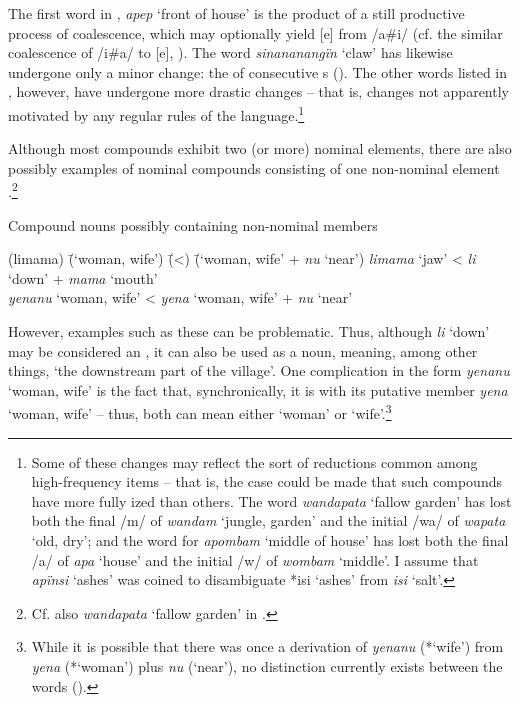 The first word in , \textit{apep} ‘front of house’ is the product of a still productive  process of coalescence, which may optionally yield [e] from /a\#i/ (cf. the similar coalescence of /i\#a/ to [e], ). The word \textit{sinananangïn} ‘claw’ has likewise undergone only a minor change: the  of consecutive s (). The other words listed in , however, have undergone more drastic changes – that is, changes not apparently motivated by any regular  rules of the language.\footnote{Some of these changes may reflect the sort of  reductions common among high-frequency  items -- that is, the case could be made that such compounds have more fully ized than others. The word \textit{wandapata} ‘fallow garden’ has lost both the final /m/ of \textit{wandam} ‘jungle, garden’ and the initial /wa/ of \textit{wapata} ‘old, dry’; and the word for \textit{apombam} ‘middle of house’ has lost both the final /a/ of \textit{apa} ‘house’ and the initial /w/ of \textit{wombam} ‘middle’. I assume that \textit{apïnsi} ‘ashes’ was coined to disambiguate *isi ‘ashes’ from \textit{isi} ‘salt’.}

  Although most compounds exhibit two (or more) nominal elements, there are also possibly examples of nominal compounds consisting of one non-nominal element .\footnote{Cf. also \textit{wandapata} ‘fallow garden’ in .}
  
\ea%
    \label{ex:nouns:45a}
          Compound nouns possibly containing non-nominal members\\
\begin{tabbing}
{(limama)} \= {(‘woman, wife’)} \= {(<)} \= {(‘woman, wife’ + \textit{nu} ‘near’)}\kill
{\textit{limama}} \> {‘jaw’} \> {<} \> {\textit{li} ‘down’ + \textit{mama} ‘mouth’}\\
{\textit{yenanu}} \> {‘woman, wife’} \> {<} \> {\textit{yena} ‘woman, wife’ + \textit{nu} ‘near’}
\end{tabbing}
\z

However, examples such as these can be problematic. Thus, although \textit{li} ‘down’ may be considered an , it can also be used as a noun, meaning, among other things, ‘the downstream part of the village’. One complication in the form \textit{yenanu} ‘woman, wife’ is the fact that, synchronically, it is  with its putative  member \textit{yena} ‘woman, wife’ -- thus, both can mean either ‘woman’ or ‘wife’.\footnote{While it is possible that there was once a derivation of \textit{yenanu} (*‘wife’) from \textit{yena} (*‘woman’) plus \textit{nu} (‘near’), no  distinction currently exists between the words ().}

